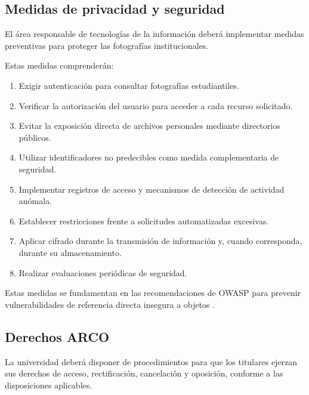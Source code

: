 \documentclass[12pt]{article}
\begin{document}
\subsection{Medidas de privacidad y seguridad}

El área responsable de tecnologías
de la información deberá implementar
medidas preventivas para proteger
las fotografías institucionales.

Estas medidas comprenderán:

\begin{enumerate}
    \item Exigir autenticación para
    consultar fotografías estudiantiles.

    \item Verificar la autorización
    del usuario para acceder
    a cada recurso solicitado.

    \item Evitar la exposición directa
    de archivos personales mediante
    directorios públicos.

    \item Utilizar identificadores
    no predecibles como medida
    complementaria de seguridad.

    \item Implementar registros
    de acceso y mecanismos de
    detección de actividad anómala.

    \item Establecer restricciones
    frente a solicitudes automatizadas
    excesivas.

    \item Aplicar cifrado durante
    la transmisión de información
    y, cuando corresponda,
    durante su almacenamiento.

    \item Realizar evaluaciones
    periódicas de seguridad.
\end{enumerate}

Estas medidas se fundamentan
en las recomendaciones de OWASP
para prevenir vulnerabilidades
de referencia directa insegura
a objetos \parencite{owaspidor}.

\subsection{Derechos ARCO}

La universidad deberá disponer
de procedimientos para que
los titulares ejerzan sus
derechos de acceso,
rectificación, cancelación
y oposición, conforme
a las disposiciones aplicables.
\end{document}
